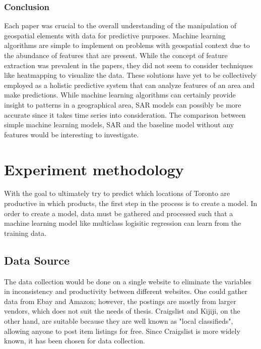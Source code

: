 \documentclass[12pt]{article}
\begin{document}
   \subsubsection{Conclusion}
   Each paper was crucial to the overall understanding of the manipulation of geospatial elements with data for predictive purposes. Machine learning algorithms are simple to implement on problems with geospatial context due to the abundance of features that are present. While the concept of feature extraction was prevalent in the papers, they did not seem to consider techniques like heatmapping to visualize the data. These solutions have yet to be collectively employed as a holistic predictive system that can analyze features of an area and make predictions. While machine learning algorithms can certainly provide insight to patterns in a geographical area, SAR models can possibly be more accurate since it takes time series into consideration. The comparison between simple machine learning models, SAR and the baseline model without any features would be interesting to investigate. 



   \section{Experiment methodology}
   With the goal to ultimately try to predict which locations of Toronto are productive in which products, the first step in the process is to create a model. In order to create a model, data must be gathered and processed such that a machine learning model like multiclass logisitic regression can learn from the training data. 

   \subsection{Data Source}
   The data collection would be done on a single website to eliminate the variables in inconsistency and productivity between different websites. One could gather data from Ebay and Amazon; however, the postings are mostly from larger vendors, which does not suit the needs of thesis. Craigslist and Kijiji, on the other hand, are suitable because they are well known as "local classifieds", allowing anyone to post item listings for free. Since Craigslist is more widely known, it has been chosen for data collection. 
\end{document}

